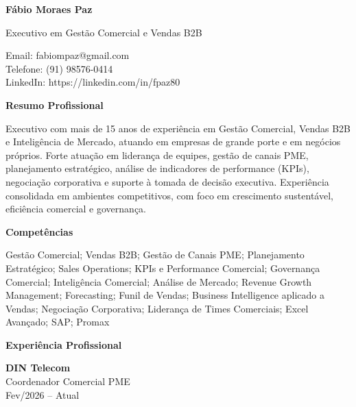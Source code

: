 \documentclass[11pt,a4paper]{article}
\begin{document}
\textbf{\LARGE Fábio Moraes Paz}

\vspace{4pt}

Executivo em Gestão Comercial e Vendas B2B

\vspace{6pt}

Email: fabiompaz@gmail.com \\
Telefone: (91) 98576-0414 \\
LinkedIn: https://linkedin.com/in/fpaz80

\vspace{14pt}

\textbf{Resumo Profissional}

Executivo com mais de 15 anos de experiência em Gestão Comercial, Vendas B2B e Inteligência de Mercado, atuando em empresas de grande porte e em negócios próprios. Forte atuação em liderança de equipes, gestão de canais PME, planejamento estratégico, análise de indicadores de performance (KPIs), negociação corporativa e suporte à tomada de decisão executiva. Experiência consolidada em ambientes competitivos, com foco em crescimento sustentável, eficiência comercial e governança.

\vspace{12pt}

\textbf{Competências}

Gestão Comercial; Vendas B2B; Gestão de Canais PME; Planejamento Estratégico; Sales Operations; KPIs e Performance Comercial; Governança Comercial; Inteligência Comercial; Análise de Mercado; Revenue Growth Management; Forecasting; Funil de Vendas; Business Intelligence aplicado a Vendas; Negociação Corporativa; Liderança de Times Comerciais; Excel Avançado; SAP; Promax

\vspace{12pt}

\textbf{Experiência Profissional}

\vspace{6pt}

\textbf{DIN Telecom} \\
Coordenador Comercial PME \\
Fev/2026 -- Atual
\end{document}
